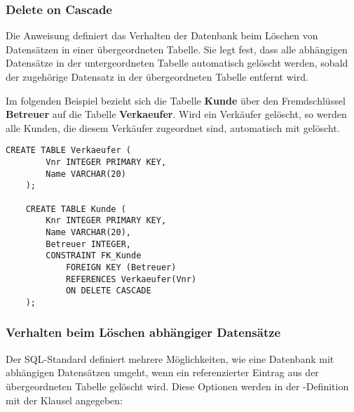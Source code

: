 \subsubsection{Delete on Cascade}
    Die Anweisung  definiert das Verhalten der Datenbank beim Löschen von Datensätzen in einer übergeordneten Tabelle.
    Sie legt fest, dass alle abhängigen Datensätze in der untergeordneten Tabelle automatisch gelöscht werden, 
    sobald der zugehörige Datensatz in der übergeordneten Tabelle entfernt wird.

    Im folgenden Beispiel bezieht sich die Tabelle \textbf{Kunde} über den Fremdschlüssel \textbf{Betreuer} auf die Tabelle \textbf{Verkaeufer}.
    Wird ein Verkäufer gelöscht, so werden alle Kunden, die diesem Verkäufer zugeordnet sind, automatisch mit gelöscht.

    \begin{lstlisting}[style=sqlstyle]
    CREATE TABLE Verkaeufer (
        Vnr INTEGER PRIMARY KEY,
        Name VARCHAR(20)
    );

    CREATE TABLE Kunde (
        Knr INTEGER PRIMARY KEY,
        Name VARCHAR(20),
        Betreuer INTEGER,
        CONSTRAINT FK_Kunde
            FOREIGN KEY (Betreuer)
            REFERENCES Verkaeufer(Vnr)
            ON DELETE CASCADE
    );
    \end{lstlisting}

    \subsubsection{Verhalten beim Löschen abhängiger Datensätze}

Der SQL-Standard definiert mehrere Möglichkeiten, wie eine Datenbank mit 
abhängigen Datensätzen umgeht, wenn ein referenzierter Eintrag aus der übergeordneten Tabelle gelöscht wird. 
Diese Optionen werden in der -Definition mit der Klausel  angegeben:

